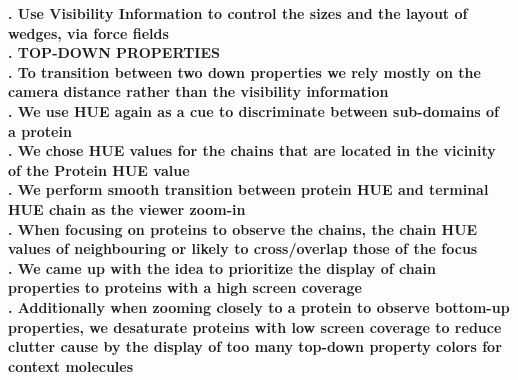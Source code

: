 \documentclass[review,journal]{vgtc}         %
\begin{document}
\textbf{. Use Visibility Information to control the sizes and the layout of wedges, via force fields} \\



\textbf{. TOP-DOWN PROPERTIES} \\

\textbf{. To transition between two down properties we rely mostly on the camera distance rather than the visibility information} \\

\textbf{. We use HUE again as a cue to discriminate between sub-domains of a protein} \\

\textbf{. We chose HUE values for the chains that are located in the vicinity of the Protein HUE value} \\

\textbf{. We perform smooth transition between protein HUE and terminal HUE chain as the viewer zoom-in} \\

\textbf{. When focusing on proteins to observe the chains, the chain HUE values of neighbouring or likely to cross/overlap those of the focus} \\

\textbf{. We came up with the idea to prioritize the display of chain properties to proteins with a high screen coverage} \\

\textbf{. Additionally when zooming closely to a protein to observe bottom-up properties, we desaturate proteins with low screen coverage to reduce clutter cause by the display of too many top-down property colors for context molecules } \\ 
\end{document}
